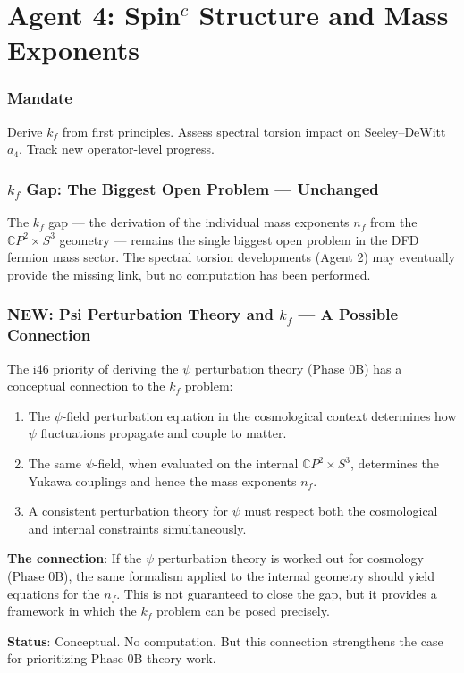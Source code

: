 \documentclass[11pt,a4paper]{article}
\newcommand{\NEW}{\textcolor{dfdblue}{\textbf{NEW}}}
\newcommand{\CP}{\mathbb{C}P}
\begin{document}
\part{Agent 4: Spin$^c$ Structure and Mass Exponents}
\label{part:agent4}

\section{Mandate}

Derive $k_f$ from first principles. Assess spectral torsion impact on Seeley--DeWitt $a_4$. Track new operator-level progress.

\section{$k_f$ Gap: The Biggest Open Problem --- Unchanged}

The $k_f$ gap --- the derivation of the individual mass exponents $n_f$ from the $\CP^2 \times S^3$ geometry --- remains the single biggest open problem in the DFD fermion mass sector. The spectral torsion developments (Agent 2) may eventually provide the missing link, but no computation has been performed.

\section{\NEW: Psi Perturbation Theory and $k_f$ --- A Possible Connection}

\begin{tcolorbox}[colback=yellow!5!white, colframe=yellow!60!black,
  title={Conceptual Link: $\psi$ Perturbation Theory and $k_f$ Derivation}]

The i46 priority of deriving the $\psi$ perturbation theory (Phase 0B) has a conceptual connection to the $k_f$ problem:

\begin{enumerate}
\item The $\psi$-field perturbation equation in the cosmological context determines how $\psi$ fluctuations propagate and couple to matter.
\item The same $\psi$-field, when evaluated on the internal $\CP^2 \times S^3$, determines the Yukawa couplings and hence the mass exponents $n_f$.
\item A consistent perturbation theory for $\psi$ must respect both the cosmological and internal constraints simultaneously.
\end{enumerate}

\textbf{The connection}: If the $\psi$ perturbation theory is worked out for cosmology (Phase 0B), the same formalism applied to the internal geometry should yield equations for the $n_f$. This is not guaranteed to close the gap, but it provides a framework in which the $k_f$ problem can be posed precisely.

\textbf{Status}: Conceptual. No computation. But this connection strengthens the case for prioritizing Phase 0B theory work.
\end{tcolorbox}
\end{document}
